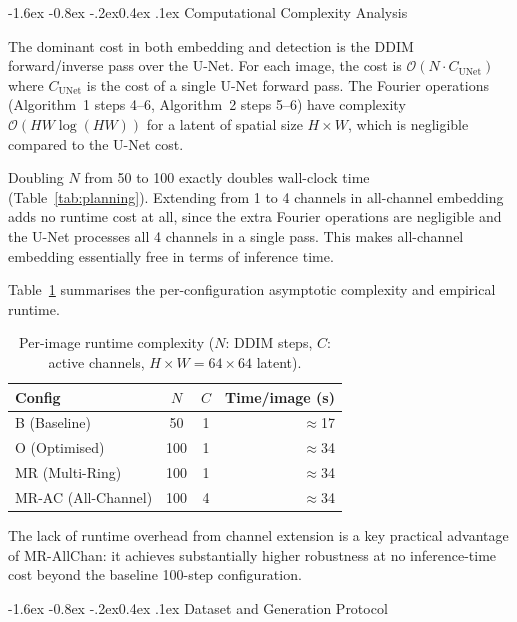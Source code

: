 \documentclass[10pt,twocolumn]{article}
\makeatletter
\renewcommand\subsection{\@startsection{subsection}{2}{\z@}%
  {-1.6ex \@plus -0.8ex \@minus -.2ex}{0.4ex \@plus .1ex}%
  {\normalfont\normalsize\itshape}}
\makeatother
\begin{document}
\subsection{Computational Complexity Analysis}
\label{sec:complexity}

The dominant cost in both embedding and detection is the DDIM forward/inverse
pass over the U-Net.
For each image, the cost is $\mathcal{O}(N \cdot C_{\text{UNet}})$
where $C_{\text{UNet}}$ is the cost of a single U-Net forward pass.
The Fourier operations (Algorithm~1 steps 4--6, Algorithm~2 steps 5--6)
have complexity $\mathcal{O}(HW\log(HW))$ for a latent of spatial size
$H \times W$, which is negligible compared to the U-Net cost.

Doubling $N$ from 50 to 100 exactly doubles wall-clock time
(Table~\ref{tab:planning}).
Extending from 1 to 4 channels in all-channel embedding
adds no runtime cost at all, since the extra Fourier operations
are negligible and the U-Net processes all 4 channels in a single pass.
This makes all-channel embedding essentially free in terms of inference time.

Table~\ref{tab:complexity} summarises the per-configuration asymptotic
complexity and empirical runtime.

\begin{table}[htbp]
  \centering
  \caption{Per-image runtime complexity ($N$: DDIM steps, $C$: active channels,
    $H{\times}W{=}64{\times}64$ latent).}
  \label{tab:complexity}
  \setlength{\tabcolsep}{4pt}
  \small
  \begin{tabular}{lccr}
    \toprule
    \textbf{Config} & $N$ & $C$ & \textbf{Time/image (s)} \\
    \midrule
    B (Baseline)        & 50  & 1 & $\approx$17 \\
    O (Optimised)       & 100 & 1 & $\approx$34 \\
    MR (Multi-Ring)     & 100 & 1 & $\approx$34 \\
    MR-AC (All-Channel) & 100 & 4 & $\approx$34 \\
    \bottomrule
  \end{tabular}
\end{table}

The lack of runtime overhead from channel extension is a key practical
advantage of MR-AllChan: it achieves substantially higher robustness at
no inference-time cost beyond the baseline 100-step configuration.

\subsection{Dataset and Generation Protocol}
\end{document}
